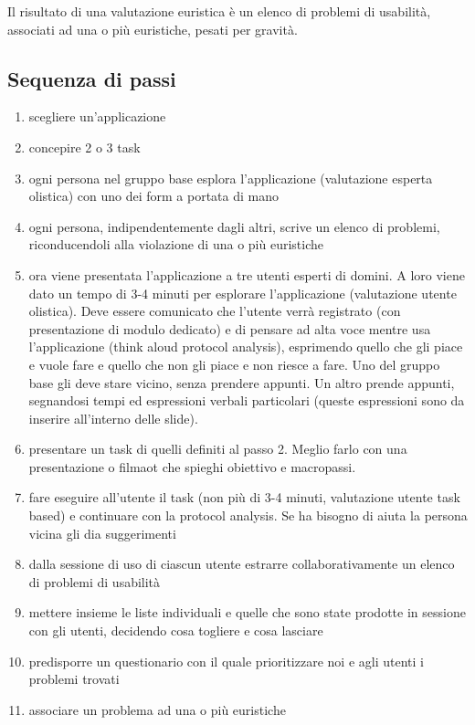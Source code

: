 \documentclass[11pt,a4paper]{book}
\begin{document}
Il risultato di una valutazione euristica è un elenco di problemi di usabilità, associati ad una o più euristiche, pesati per gravità.

\subsection{Sequenza di passi}
\begin{enumerate}
	\item scegliere un'applicazione
	\item concepire 2 o 3 task
	\item ogni persona nel gruppo base esplora l'applicazione (valutazione esperta olistica) con uno dei form a portata di mano
	\item ogni persona, indipendentemente dagli altri, scrive un elenco di problemi, riconducendoli alla violazione di una o più euristiche
	\item ora viene presentata l'applicazione a tre utenti esperti di domini. A loro viene dato un tempo di 3-4 minuti per esplorare l'applicazione (valutazione utente olistica). Deve essere comunicato che l'utente verrà registrato (con presentazione di modulo dedicato) e di pensare ad alta voce mentre usa l'applicazione (think aloud protocol analysis), esprimendo quello che gli piace e vuole fare e quello che non gli piace e non riesce a fare. Uno del gruppo base gli deve stare vicino, senza prendere appunti. Un altro prende appunti, segnandosi tempi ed espressioni verbali particolari (queste espressioni sono da inserire all'interno delle slide).
	\item presentare un task di quelli definiti al passo 2. Meglio farlo con una presentazione o filmaot che spieghi obiettivo e macropassi.
	\item fare eseguire all'utente il task (non più di 3-4 minuti, valutazione utente task based) e continuare con la protocol analysis. Se ha bisogno di aiuta la persona vicina gli dia suggerimenti
	\item dalla sessione di uso di ciascun utente estrarre collaborativamente un elenco di problemi di usabilità
	\item mettere insieme le liste individuali e quelle che sono state prodotte in sessione con gli utenti, decidendo cosa togliere e cosa lasciare
	\item predisporre un questionario con il quale prioritizzare noi e agli utenti i problemi trovati
	\item associare un problema ad una o più euristiche
\end{enumerate}
\end{document}
